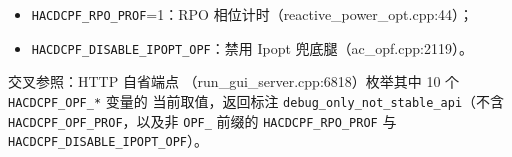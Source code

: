 \begin{itemize}
\begin{itemize}
              factorize/solve/assembly 与分后端分解（:126）；
        \item \texttt{HACDCPF\_RPO\_PROF}=1：RPO 相位计时（reactive\_power\_opt.cpp:44）；
        \item \texttt{HACDCPF\_DISABLE\_IPOPT\_OPF}：禁用 Ipopt 兜底腿（ac\_opf.cpp:2119）。
        \end{itemize}
        交叉参照：HTTP 自省端点 
        （run\_gui\_server.cpp:6818）枚举其中 10 个 \texttt{HACDCPF\_OPF\_*} 变量的
        当前取值，返回标注 \texttt{debug\_only\_not\_stable\_api}（不含
        \texttt{HACDCPF\_OPF\_PROF}，以及非 \texttt{OPF\_} 前缀的
        \texttt{HACDCPF\_RPO\_PROF} 与 \texttt{HACDCPF\_DISABLE\_IPOPT\_OPF}）。
\end{itemize}
